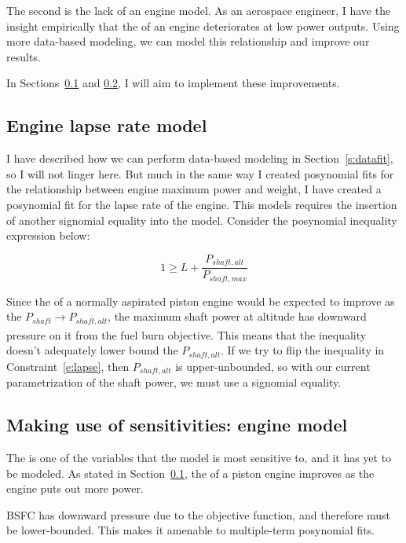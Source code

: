 The second is the lack of an engine \BSFC model. As an aerospace engineer, I have the insight
empirically that the \BSFC of an engine deteriorates at low power outputs.  Using more
data-based modeling, we can model this relationship and improve our results.

In Sections~\ref{s:lapse} and \ref{s:BSFC}, I will aim to implement these improvements.

\subsection{Engine lapse rate model}
\label{s:lapse}

I have described how we can perform data-based modeling in Section~\ref{s:datafit}, so I will
not linger here. But much in the same way I created posynomial fits for the relationship between
engine maximum power and weight, I have created a posynomial fit for the lapse rate of the engine.
This models requires the insertion of another signomial equality into the model. Consider the
posynomial inequality expression below:

\begin{equation}
    \label{e:lapse}
    1 \geq L + \frac{P_{shaft,alt}}{P_{shaft,max}}
\end{equation}

Since the \BSFC of a normally aspirated piston engine would be expected to improve
as the $P_{shaft} \xrightarrow[]{} P_{shaft,alt}$, the maximum shaft
power at altitude has downward pressure on it from the fuel burn objective. This means that the
inequality doesn't adequately lower bound the $P_{shaft,alt}$. If we try to flip the inequality in
Constraint~\ref{e:lapse}, then $P_{shaft,alt}$ is upper-unbounded, so with our current parametrization
of the shaft power, we must use a signomial equality.

\subsection{Making use of sensitivities: engine \BSFC model}
\label{s:BSFC}

The \BSFC is one of the variables that the model is most sensitive to, and it has yet to be modeled. As
stated in Section~\ref{s:lapse}, the \BSFC of a piston engine improves as the engine puts out more power.

BSFC has downward pressure due to the objective function, and therefore must be lower-bounded. This makes
it amenable to multiple-term posynomial fits.

